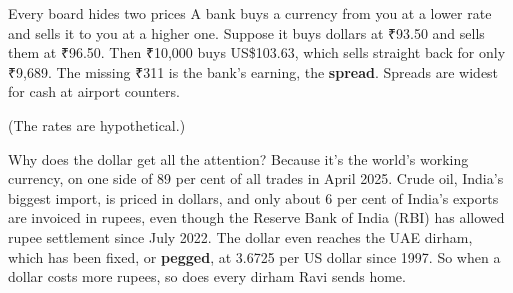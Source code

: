 \begin{didyouknow}{Every board hides two prices}
A bank buys a currency from you at a lower rate and sells it to you at a higher one. Suppose it buys dollars at ₹93.50 and sells them at ₹96.50. Then ₹10,000 buys US\$103.63, which sells straight back for only ₹9,689. The missing ₹311 is the bank's earning, the \textbf{spread}. Spreads are widest for cash at airport counters.

(The rates are hypothetical.)
\end{didyouknow}

Why does the dollar get all the attention? Because it's the world's working currency, on one side of 89 per cent of all trades in April 2025.\cite{bis2025} Crude oil, India's biggest import, is priced in dollars, and only about 6 per cent of India's exports are invoiced in rupees,\cite{rbi2026a} even though the Reserve Bank of India (RBI) has allowed rupee settlement since July 2022.\cite{rbi2022} The dollar even reaches the UAE dirham, which has been fixed, or \textbf{pegged}, at 3.6725 per US dollar since 1997.\cite{nagraj2024}  So when a dollar costs more rupees, so does every dirham Ravi sends home.
